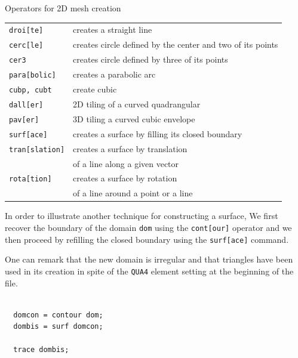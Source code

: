 \begin{gbox}{Operators for 2D mesh creation}
\begin{tabular}{ll}
\texttt{droi[te]} & creates a straight line \\
\texttt{cerc[le]} & creates circle defined by the center and two of its points \\
\texttt{cer3} & creates circle defined by three of its points \\
\texttt{para[bolic]} & creates a parabolic arc \\
\texttt{cubp, cubt} & create cubic  \\[2.mm]
\texttt{dall[er]} & 2D tiling of a curved quadrangular  \\
\texttt{pav[er]} &  3D tiling a curved cubic envelope   \\
\texttt{surf[ace]} & creates a surface by filling its closed boundary \\
\texttt{tran[slation]} & creates a surface by translation \\
   & of a line along a given vector  \\
\texttt{rota[tion]} & creates a surface by rotation \\
   & of a line around a point or a line  \\
\end{tabular}
\end{gbox}


\begin{castemcom}
In order to illustrate another technique for constructing a surface, We first 
recover the boundary of the domain \texttt{dom} using the \texttt{cont[our]} 
operator and we then proceed by refilling the closed boundary using the 
\texttt{surf[ace]} command.

One can remark that the new domain is irregular and that triangles have
been used in its creation in spite of the \texttt{QUA4} element setting 
at the beginning of the file.


      
\end{castemcom}
\begin{castemlines}
\begin{verbatim}
 
  domcon = contour dom;
  dombis = surf domcon;
 
  trace dombis;
  
\end{verbatim}
\end{castemlines}

